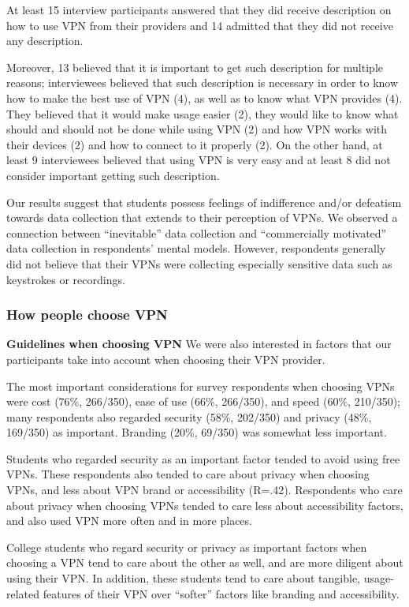 At least 15 interview participants answered that they did receive description
on how to use VPN from their providers and 14 admitted that they did not
receive any description.  

Moreover, 13 believed that it is important to get such description for
multiple reasons; interviewees believed that such description is necessary in
order to know how to make the best use of VPN (4), as well as to know what VPN
provides (4). They believed that it would make usage easier (2), they would
like to know what should and should not be done while using VPN (2) and how
VPN works with their devices (2) and how to connect to it properly (2). On the
other hand, at least 9 interviewees believed that using VPN is very easy and
at least 8 did not consider important getting such description. 

Our results suggest that students possess feelings of indifference and/or
defeatism towards data collection that extends to their perception of VPNs. We
observed a connection between “inevitable” data collection and “commercially
motivated” data collection in respondents’ mental models. However, respondents
generally did not believe that their VPNs were collecting especially sensitive
data such as keystrokes or recordings.



\subsubsection{How people choose VPN} \label{sec:findings-choosing}
\textbf{Guidelines when choosing VPN} We were also interested in factors that
our participants take into account when choosing their VPN provider.

The most important considerations for survey respondents when choosing VPNs
were cost (76\%, 266/350), ease of use (66\%, 266/350), and speed (60\%,
210/350); many respondents also regarded security (58\%, 202/350) and privacy
(48\%, 169/350) as important. Branding (20\%, 69/350) was somewhat less
important.

Students who regarded security as an important factor tended to avoid using
free VPNs. These respondents also tended to care about privacy when choosing
VPNs, and less about VPN brand or accessibility (R=.42). Respondents who care
about privacy when choosing VPNs tended to care less about accessibility
factors, and also used VPN more often and in more places.

College students who regard security or privacy as important factors when
choosing a VPN tend to care about the other as well, and are more diligent
about using their VPN. In addition, these students tend to care about
tangible, usage-related features of their VPN over “softer” factors like
branding and accessibility.


